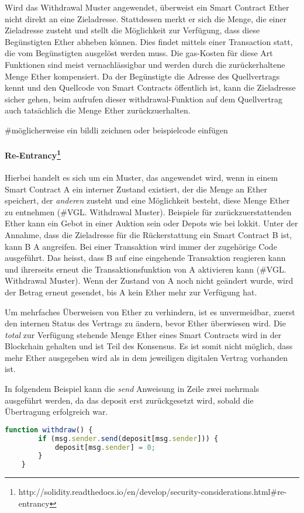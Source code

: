 Wird das Withdrawal Muster angewendet, überweist ein Smart Contract Ether nicht direkt an eine Zieladresse. Stattdessen merkt er sich die Menge, die einer Zieladresse zusteht und stellt die Möglichkeit zur Verfügung, dass diese Begünstigten Ether abheben können. Dies findet mittels einer Transaction statt, die vom Begünstigten ausgelöst werden muss. Die gas-Kosten für diese Art Funktionen sind meist vernachlässigbar und werden durch die zurückerhaltene Menge Ether kompensiert. Da der Begünstigte die Adresse des Quellvertrags kennt und den Quellcode von Smart Contracts öffentlich ist, kann die Zieladresse sicher gehen, beim aufrufen dieser withdrawal-Funktion auf dem Quellvertrag auch tatsächlich die Menge Ether zurückzuerhalten.


\#möglicherweise ein bildli zeichnen oder beispielcode einfügen


\paragraph{Re-Entrancy\footnote{http://solidity.readthedocs.io/en/develop/security-considerations.html\#re-entrancy}}
Hierbei handelt es sich um ein Muster, das angewendet wird, wenn in einem Smart Contract A ein interner Zustand existiert, der die Menge an Ether speichert, der \emph{anderen} zusteht und eine Möglichkeit besteht, diese Menge Ether zu entnehmen (\#VGL. Withdrawal Muster). Beispiele für zurückzuerstattenden Ether kann ein Gebot in einer Auktion sein oder Depots wie bei lokkit.
Unter der Annahme, dass die Zieladresse für die Rückerstattung ein Smart Contract B ist, kann B A angreifen. Bei einer Transaktion wird immer der zugehörige Code ausgeführt. Das heisst, dass B auf eine eingehende Transaktion reagieren kann und ihrerseits erneut die Transaktionsfunktion von A aktivieren kann (\#VGL. Withdrawal Muster). Wenn der Zustand von A noch nicht geändert wurde, wird der Betrag erneut gesendet, bis A kein Ether mehr zur Verfügung hat.

Um mehrfaches Überweisen von Ether zu verhindern, ist es unvermeidbar, zuerst den internen Status des Vertrags zu ändern, bevor Ether überwiesen wird. Die \emph{total} zur Verfügung stehende Menge Ether eines Smart Contracts wird in der Blockchain gehalten und ist Teil des Konsensus. Es ist somit nicht möglich, dass mehr Ether ausgegeben wird als in dem jeweiligen digitalen Vertrag vorhanden ist. 

In folgendem Beispiel kann die \emph{send} Anweisung in Zeile zwei mehrmals ausgeführt werden, da das deposit erst zurückgesetzt wird, sobald die Übertragung erfolgreich war.
\begin{lstlisting}[language=javascript,caption=fehlerhaftes Code Snippet]
    function withdraw() {
        if (msg.sender.send(deposit[msg.sender])) {
            deposit[msg.sender] = 0;
        }
    }
\end{lstlisting}


